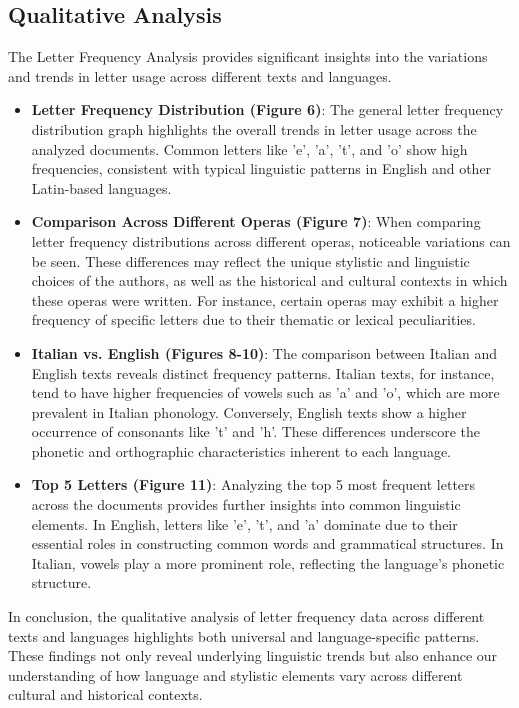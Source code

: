 \subsection{Qualitative Analysis}

The Letter Frequency Analysis provides significant insights into the variations and trends in letter usage across different texts and languages.

\begin{itemize}
\item \textbf{Letter Frequency Distribution (Figure 6)}: The general letter frequency distribution graph highlights the overall trends in letter usage across the analyzed documents. Common letters like 'e', 'a', 't', and 'o' show high frequencies, consistent with typical linguistic patterns in English and other Latin-based languages.

\item \textbf{Comparison Across Different Operas (Figure 7)}: When comparing letter frequency distributions across different operas, noticeable variations can be seen. These differences may reflect the unique stylistic and linguistic choices of the authors, as well as the historical and cultural contexts in which these operas were written. For instance, certain operas may exhibit a higher frequency of specific letters due to their thematic or lexical peculiarities.

\item \textbf{Italian vs. English (Figures 8-10)}: The comparison between Italian and English texts reveals distinct frequency patterns. Italian texts, for instance, tend to have higher frequencies of vowels such as 'a' and 'o', which are more prevalent in Italian phonology. Conversely, English texts show a higher occurrence of consonants like 't' and 'h'. These differences underscore the phonetic and orthographic characteristics inherent to each language.

\item \textbf{Top 5 Letters (Figure 11)}: Analyzing the top 5 most frequent letters across the documents provides further insights into common linguistic elements. In English, letters like 'e', 't', and 'a' dominate due to their essential roles in constructing common words and grammatical structures. In Italian, vowels play a more prominent role, reflecting the language's phonetic structure.

\end{itemize}

\noindent In conclusion, the qualitative analysis of letter frequency data across different texts and languages highlights both universal and language-specific patterns. These findings not only reveal underlying linguistic trends but also enhance our understanding of how language and stylistic elements vary across different cultural and historical contexts.